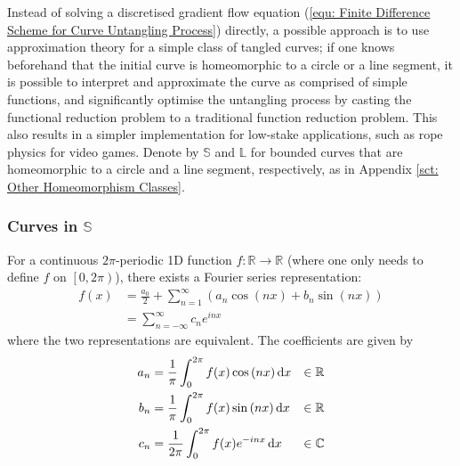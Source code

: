 \documentclass[../dissertation.tex]{subfiles}
\begin{document}
Instead of solving a discretised gradient flow equation (\ref{equ: Finite Difference Scheme for Curve Untangling Process}) directly,
a possible approach is to use approximation theory for a simple class of tangled curves;
if one knows beforehand that the initial curve is homeomorphic to a circle or a line segment,
it is possible to interpret and approximate the curve as comprised of simple functions,
and significantly optimise the untangling process by casting the functional reduction problem to
a traditional function reduction problem.
This also results in a simpler implementation for low-stake applications,
such as rope physics for video games.
Denote by $\mathbb{S}$ and $\mathbb{L}$ for bounded curves that are homeomorphic to a circle and a line segment, respectively, as in Appendix \ref{sct: Other Homeomorphism Classes}.

\subsubsection{Curves in $\mathbb{S}$}
For a continuous $2\pi$-periodic 1D function $f:\mathbb{R} \rightarrow \mathbb{R}$
(where one only needs to define $f$ on $\left[ 0,2\pi \right)$),
there exists a Fourier series representation:
\begin{align}
    f(x) &= \frac{a_0}{2} + \sum_{n=1}^{\infty} \left( a_n \cos {(nx)} + b_n \sin {(nx)} \right) \\
    &= \sum_{n=-\infty}^{\infty} c_n e^{inx}
\end{align}
where the two representations are equivalent.
The coefficients are given by
\begin{align}
    a_n &= \frac{1}{\pi} \int_{0}^{2\pi} f(x) \cos {\left( nx \right)} \, \text{d} x &\in \mathbb{R}\\
    b_n &= \frac{1}{\pi} \int_{0}^{2\pi} f(x) \sin {\left( nx \right)} \, \text{d} x &\in \mathbb{R} \\
    c_n &= \frac{1}{2 \pi} \int_{0}^{2\pi} f(x) e^{-inx} \, \text{d} x &\in \mathbb{C}
\end{align}
\end{document}
